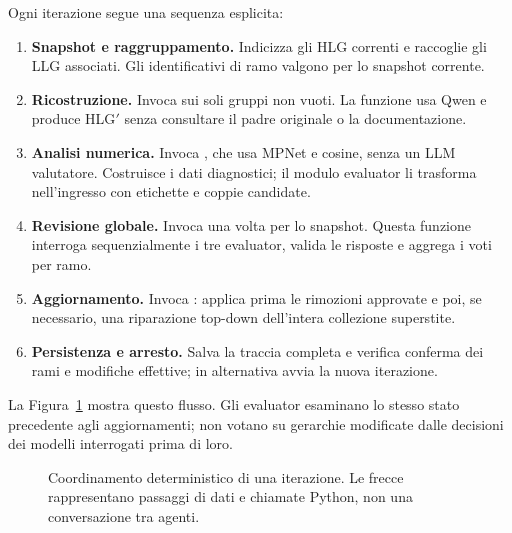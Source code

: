 Ogni iterazione segue una sequenza esplicita:
\begin{enumerate}
\item \textbf{Snapshot e raggruppamento.} Indicizza gli HLG correnti e raccoglie
gli LLG associati. Gli identificativi di ramo valgono per lo snapshot corrente.
\item \textbf{Ricostruzione.} Invoca  sui
soli gruppi non vuoti. La funzione usa Qwen e produce HLG$'$ senza consultare
il padre originale o la documentazione.
\item \textbf{Analisi numerica.} Invoca , che
usa MPNet e cosine, senza un LLM valutatore. Costruisce i dati diagnostici;
il modulo evaluator li trasforma nell'ingresso con etichette e coppie candidate.
\item \textbf{Revisione globale.} Invoca  una
volta per lo snapshot. Questa funzione interroga sequenzialmente i tre evaluator,
valida le risposte e aggrega i voti per ramo.
\item \textbf{Aggiornamento.} Invoca : applica
prima le rimozioni approvate e poi, se necessario, una riparazione top-down
dell'intera collezione superstite.
\item \textbf{Persistenza e arresto.} Salva la traccia completa e verifica
conferma dei rami e modifiche effettive; in alternativa avvia la nuova iterazione.
\end{enumerate}
La Figura~\ref{fig:orchestrator-call-flow} mostra questo flusso. Gli evaluator
esaminano lo stesso stato precedente agli aggiornamenti; non votano su gerarchie
modificate dalle decisioni dei modelli interrogati prima di loro.

\begin{figure}[htbp]
\centering
{}
\caption{Coordinamento deterministico di una iterazione. Le frecce rappresentano
passaggi di dati e chiamate Python, non una conversazione tra agenti.}
\label{fig:orchestrator-call-flow}
\end{figure}

